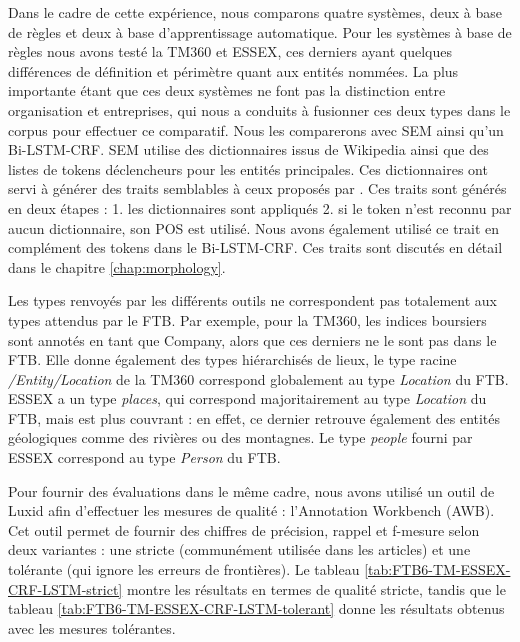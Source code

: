 \documentclass[PhD-Yoann-Dupont.tex]{subfiles}
\begin{document}
Dans le cadre de cette expérience, nous comparons quatre systèmes, deux à base de règles et deux à base d'apprentissage automatique. Pour les systèmes à base de règles nous avons testé la TM360 et ESSEX, ces derniers ayant quelques différences de définition et périmètre quant aux entités nommées. La plus importante étant que ces deux systèmes ne font pas la distinction entre organisation et entreprises, qui nous a conduits à fusionner ces deux types dans le corpus pour effectuer ce comparatif. Nous les comparerons avec SEM \citep{dupont2014reconnaisseur} ainsi qu'un Bi-LSTM-CRF. SEM utilise des dictionnaires issus de Wikipedia ainsi que des listes de tokens déclencheurs pour les entités principales. Ces dictionnaires ont servi à générer des traits semblables à ceux proposés par \citet{raymond2010reconnaissance}. Ces traits sont générés en deux étapes : 1. les dictionnaires sont appliqués 2. si le token n'est reconnu par aucun dictionnaire, son POS est utilisé. Nous avons également utilisé ce trait en complément des tokens dans le Bi-LSTM-CRF. Ces traits sont discutés en détail dans le chapitre \ref{chap:morphology}.

Les types renvoyés par les différents outils ne correspondent pas totalement aux types attendus par le FTB. Par exemple, pour la TM360, les indices boursiers sont annotés en tant que Company, alors que ces derniers ne le sont pas dans le FTB. Elle donne également des types hiérarchisés de lieux, le type racine \emph{/Entity/Location} de la TM360 correspond globalement au type \emph{Location} du FTB. ESSEX a un type \emph{places}, qui correspond majoritairement au type \emph{Location} du FTB, mais est plus couvrant : en effet, ce dernier retrouve également des entités géologiques comme des rivières ou des montagnes. Le type \emph{people} fourni par ESSEX correspond au type \emph{Person} du FTB.

Pour fournir des évaluations dans le même cadre, nous avons utilisé un outil de Luxid afin d'effectuer les mesures de qualité : l'Annotation Workbench (AWB). Cet outil permet de fournir des chiffres de précision, rappel et f-mesure selon deux variantes : une stricte (communément utilisée dans les articles) et une tolérante (qui ignore les erreurs de frontières). Le tableau \ref{tab:FTB6-TM-ESSEX-CRF-LSTM-strict} montre les résultats en termes de qualité stricte, tandis que le tableau \ref{tab:FTB6-TM-ESSEX-CRF-LSTM-tolerant} donne les résultats obtenus avec les mesures tolérantes.
\end{document}
